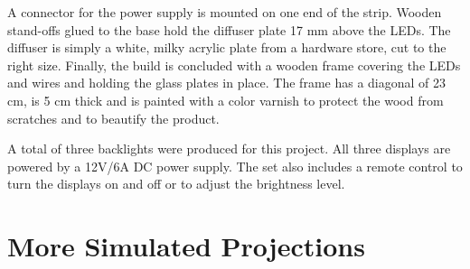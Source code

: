 A connector for the power supply is mounted on one end of the strip.
Wooden stand-offs glued to the base hold the diffuser plate 17 mm above the LEDs.
The diffuser is simply a white, milky acrylic plate from a hardware store, cut to the right size.
Finally, the build is concluded with a wooden frame covering the LEDs and wires and holding the glass plates in place.
The frame has a diagonal of 23 cm, is 5 cm thick and is painted with a color varnish to protect the wood from scratches and to beautify the product.

A total of three backlights were produced for this project.
All three displays are powered by a 12V/6A DC power supply.
The set also includes a remote control to turn the displays on and off or to adjust the brightness level.

\section{More Simulated Projections}
\label{sec:simulated_projections}

